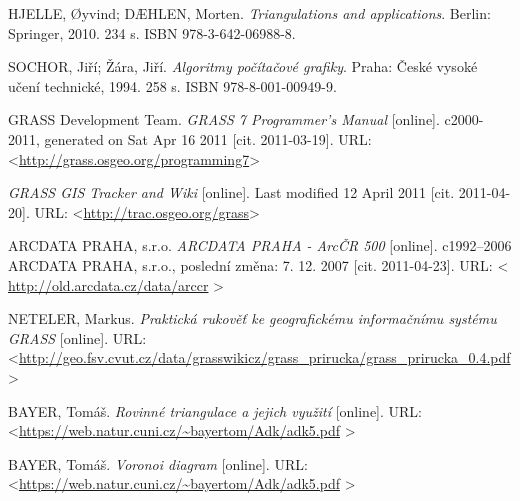 \documentclass[12pt,a4paper]{article}
\renewcommand\baselinestretch{1.3}		%
\begin{document}
\newpage
\renewcommand\baselinestretch{1.2}
\selectfont
\renewcommand{\refname}{Použité zdroje}
\addcontentsline{toc}{section}{\refname}

\begin{thebibliography}{99}
\label{literatura}


HJELLE, Øyvind; DÆHLEN, Morten. \textit{Triangulations and applications}. Berlin: Springer, 2010. 234 s. ISBN 978-3-642-06988-8.


SOCHOR, Jiří; Žára, Jiří. \textit{Algoritmy počítačové grafiky}. Praha: České vysoké učení technické, 1994. 258 s. ISBN 978-8-001-00949-9.


GRASS Development Team. \textit{GRASS 7 Programmer's Manual} [online].
c2000-2011, generated on Sat Apr 16 2011 [cit. 2011-03-19].
URL: \textless\url{http://grass.osgeo.org/programming7}\textgreater


\textit{GRASS GIS Tracker and Wiki} [online]. Last modified 12 April 2011
[cit. 2011-04-20].
URL: \textless\url{http://trac.osgeo.org/grass}\textgreater


ARCDATA PRAHA, s.r.o. \textit{ARCDATA PRAHA - ArcČR 500} [online].
c1992–2006 ARCDATA PRAHA, s.r.o., poslední změna: 7. 12. 2007 [cit. 2011-04-23].
URL: \textless
\url{http://old.arcdata.cz/data/arccr} \textgreater

NETELER, Markus. \textit{Praktická rukověť ke geografickému informačnímu systému GRASS} [online].
URL: \textless\url{http://geo.fsv.cvut.cz/data/grasswikicz/grass_prirucka/grass_prirucka_0.4.pdf}
\textgreater

BAYER, Tomáš. \textit{Rovinné triangulace a jejich využití} [online].
URL: \textless\url{https://web.natur.cuni.cz/~bayertom/Adk/adk5.pdf}
\textgreater

BAYER, Tomáš. \textit{Voronoi diagram} [online].
URL: \textless\url{https://web.natur.cuni.cz/~bayertom/Adk/adk5.pdf}
\textgreater


\end{thebibliography}
\end{document}
